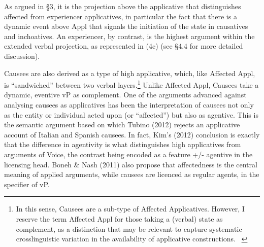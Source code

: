 \documentclass[12pt]{article}
\newenvironment{styleStandard}{\setlength\leftskip{0cm}\setlength\rightskip{0cm plus 1fil}\setlength\parindent{0cm}\setlength\parfillskip{0pt plus 1fil}\setlength\parskip{0in plus 1pt}\writerlistparindent\writerlistleftskip\leavevmode\normalfont\normalsize\writerlistlabel\ignorespaces}{\unskip\vspace{0.111in plus 0.0111in}\par}
\newcommand\writerlistleftskip{}
\newcommand\writerlistparindent{}
\newcommand\writerlistlabel{}
\begin{document}
\begin{styleStandard}
As argued in §3, it is the projection above the applicative that distinguishes affected from experiencer applicatives, in particular the fact that there is a dynamic event above Appl that signals the initiation of the state in causatives and inchoatives. An experiencer, by contrast, is the highest argument within the extended verbal projection, as represented in (4c) (see §4.4 for more detailed discussion). \ 
\end{styleStandard}

\begin{styleStandard}
Causees are also derived as a type of high applicative, which, like Affected Appl, is “sandwiched” between two verbal layers.\footnote{ In this sense, Causees are a sub-type of Affected Applicatives. However, I reserve the term Affected Appl for those taking a (verbal) state as complement, as a distinction that may be relevant to capture systematic crosslinguistic variation in the availability of applicative constructions. \ } Unlike Affected Appl, Causees take a dynamic, eventive vP as complement. One of the arguments advanced against analysing causees as applicatives has been the interpretation of causees not only as the entity or individual acted upon (or “affected”) but also as agentive. This is the semantic argument based on which Tubino (2012) rejects an applicative account of Italian and Spanish causees. In fact, Kim’s (2012) conclusion is exactly that the difference in agentivity is what distinguishes high applicatives from arguments of Voice, the contrast being encoded as a feature +/- agentive in the licensing head. Boneh \& Nash (2011) also propose that affectedness is the central meaning of applied arguments, while causees are licenced as regular agents, in the specifier of vP. 
\end{styleStandard}
\end{document}
